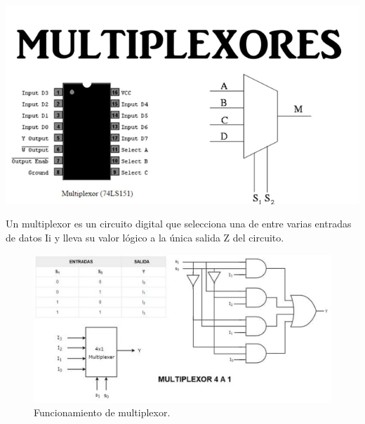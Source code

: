 \documentclass[a4paper,11pt]{report}    %
\begin{document}
\begin{minipage}{0.4\textwidth}
    
        \includegraphics[width=\linewidth]{img/18.png}
\end{minipage}
\hfill
\begin{minipage}{0.5\textwidth}
Un multiplexor es un circuito digital que selecciona una de entre varias entradas de datos Ii y lleva su valor lógico a la única salida Z del circuito.

\end{minipage}

\begin{figure}[H]
    \centering
    \includegraphics[width=0.7\linewidth]{img/21.png}
    \caption{Funcionamiento de multiplexor.}
    \label{fig:transistor-corte}
\end{figure}
\end{document}

